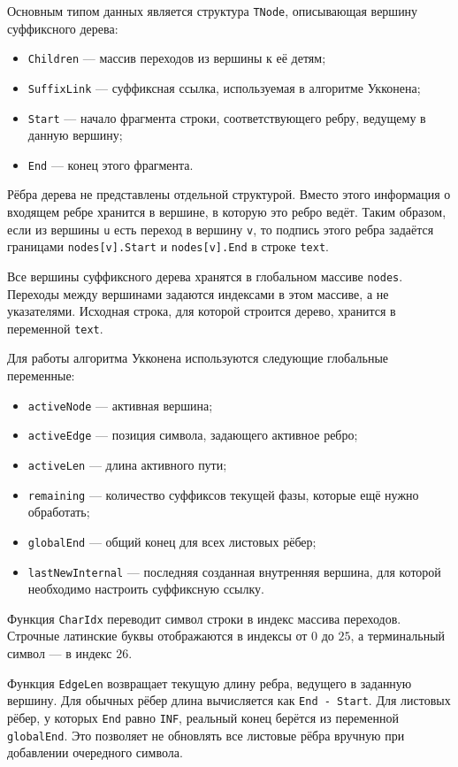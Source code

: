 \documentclass[12pt]{article}
\begin{document}
Основным типом данных является структура \texttt{TNode}, описывающая
вершину суффиксного дерева:
\begin{itemize}
	\item \texttt{Children} --- массив переходов из вершины к её детям;
	\item \texttt{SuffixLink} --- суффиксная ссылка, используемая в
	алгоритме Укконена;
	\item \texttt{Start} --- начало фрагмента строки, соответствующего
	ребру, ведущему в данную вершину;
	\item \texttt{End} --- конец этого фрагмента.
\end{itemize}

Рёбра дерева не представлены отдельной структурой. Вместо этого
информация о входящем ребре хранится в вершине, в которую это ребро
ведёт. Таким образом, если из вершины \texttt{u} есть переход в вершину
\texttt{v}, то подпись этого ребра задаётся границами
\texttt{nodes[v].Start} и \texttt{nodes[v].End} в строке \texttt{text}.

Все вершины суффиксного дерева хранятся в глобальном массиве
\texttt{nodes}. Переходы между вершинами задаются индексами в этом
массиве, а не указателями. Исходная строка, для которой строится дерево,
хранится в переменной \texttt{text}.

Для работы алгоритма Укконена используются следующие глобальные
переменные:
\begin{itemize}
	\item \texttt{activeNode} --- активная вершина;
	\item \texttt{activeEdge} --- позиция символа, задающего активное
	ребро;
	\item \texttt{activeLen} --- длина активного пути;
	\item \texttt{remaining} --- количество суффиксов текущей фазы,
	которые ещё нужно обработать;
	\item \texttt{globalEnd} --- общий конец для всех листовых рёбер;
	\item \texttt{lastNewInternal} --- последняя созданная внутренняя
	вершина, для которой необходимо настроить суффиксную ссылку.
\end{itemize}

Функция \texttt{CharIdx} переводит символ строки в индекс массива
переходов. Строчные латинские буквы отображаются в индексы от $0$ до
$25$, а терминальный символ --- в индекс $26$.

Функция \texttt{EdgeLen} возвращает текущую длину ребра, ведущего в
заданную вершину. Для обычных рёбер длина вычисляется как
\texttt{End - Start}. Для листовых рёбер, у которых \texttt{End} равно
\texttt{INF}, реальный конец берётся из переменной \texttt{globalEnd}.
Это позволяет не обновлять все листовые рёбра вручную при добавлении
очередного символа.
\end{document}
